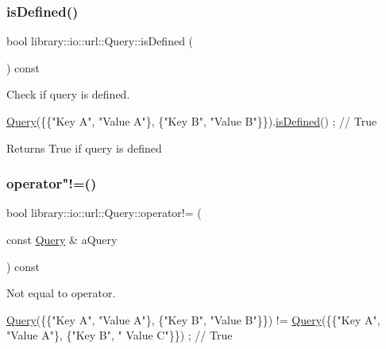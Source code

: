 \subsubsection{\texorpdfstring{is\+Defined()}{isDefined()}}
{\footnotesize\ttfamily bool library\+::io\+::url\+::\+Query\+::is\+Defined (\begin{DoxyParamCaption}{ }\end{DoxyParamCaption}) const}



Check if query is defined. 


\begin{DoxyCode}
\hyperlink{classlibrary_1_1io_1_1url_1_1_query_a6781de8f7b7251f8e17c191434b08039}{Query}(\{\{\textcolor{stringliteral}{"Key A"}, \textcolor{stringliteral}{"Value A"}\}, \{\textcolor{stringliteral}{"Key B"}, \textcolor{stringliteral}{"Value B"}\}\}).\hyperlink{classlibrary_1_1io_1_1url_1_1_query_a2f7f9b16e407735269d8e97f12ef9a8b}{isDefined}() ; \textcolor{comment}{// True}
\end{DoxyCode}


\begin{DoxyReturn}{Returns}
True if query is defined 
\end{DoxyReturn}
\mbox{\label{classlibrary_1_1io_1_1url_1_1_query_a9dbb8fd3e8063c752db6fdd62673eac3}} 
\subsubsection{\texorpdfstring{operator"!=()}{operator!=()}}
{\footnotesize\ttfamily bool library\+::io\+::url\+::\+Query\+::operator!= (\begin{DoxyParamCaption}\item[{const \hyperlink{classlibrary_1_1io_1_1url_1_1_query}{Query} \&}]{a\+Query }\end{DoxyParamCaption}) const}



Not equal to operator. 


\begin{DoxyCode}
\hyperlink{classlibrary_1_1io_1_1url_1_1_query_a6781de8f7b7251f8e17c191434b08039}{Query}(\{\{\textcolor{stringliteral}{"Key A"}, \textcolor{stringliteral}{"Value A"}\}, \{\textcolor{stringliteral}{"Key B"}, \textcolor{stringliteral}{"Value B"}\}\}) != \hyperlink{classlibrary_1_1io_1_1url_1_1_query_a6781de8f7b7251f8e17c191434b08039}{Query}(\{\{\textcolor{stringliteral}{"Key A"}, \textcolor{stringliteral}{"Value A"}\}, \{\textcolor{stringliteral}{"Key B"}, \textcolor{stringliteral}{"
      Value C"}\}\}) ; \textcolor{comment}{// True}
\end{DoxyCode}



